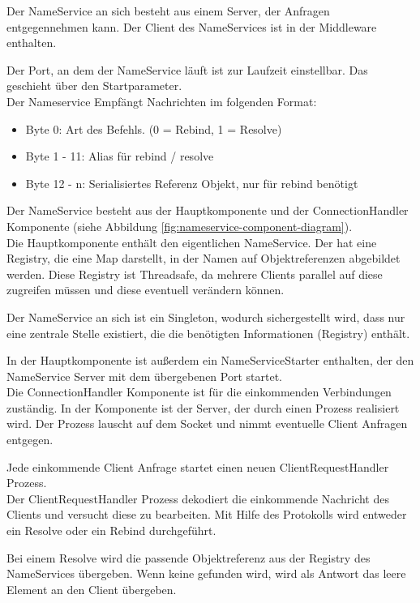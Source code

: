 \documentclass{article}
\begin{document}
Der NameService an sich besteht aus einem Server, der Anfragen entgegennehmen kann.
Der Client des NameServices ist in der Middleware enthalten.

Der Port, an dem der NameService läuft ist zur Laufzeit einstellbar. Das geschieht über den Startparameter.\\

Der Nameservice Empfängt Nachrichten im folgenden Format:
\begin{itemize}
\item Byte 0: Art des Befehls. (0 = Rebind, 1 = Resolve)
\item Byte 1 - 11: Alias für rebind / resolve
\item Byte 12 - n: Serialisiertes Referenz Objekt, nur für rebind benötigt
\end{itemize}

Der NameService besteht aus der Hauptkomponente und der ConnectionHandler Komponente (siehe Abbildung
\ref{fig:nameservice-component-diagram}).\\

Die Hauptkomponente enthält den eigentlichen NameService. Der hat eine Registry, die eine Map darstellt, in der Namen
auf Objektreferenzen abgebildet werden. Diese Registry ist Threadsafe, da mehrere Clients parallel auf diese
zugreifen müssen und diese eventuell verändern können.

Der NameService an sich ist ein Singleton, wodurch sichergestellt wird, dass nur eine zentrale Stelle existiert, die
die benötigten Informationen (Registry) enthält.

In der Hauptkomponente ist außerdem ein NameServiceStarter enthalten, der den NameService Server mit dem übergebenen
Port startet.\\

Die ConnectionHandler Komponente ist für die einkommenden Verbindungen zuständig. In der Komponente ist der Server, der
durch einen Prozess realisiert wird. Der Prozess lauscht auf dem Socket und nimmt eventuelle Client Anfragen entgegen.

Jede einkommende Client Anfrage startet einen neuen ClientRequestHandler Prozess.\\

Der ClientRequestHandler Prozess dekodiert die einkommende Nachricht des Clients und versucht diese zu bearbeiten.
Mit Hilfe des Protokolls wird entweder ein Resolve oder ein Rebind durchgeführt.

Bei einem Resolve wird die passende Objektreferenz aus der Registry des NameServices übergeben. Wenn keine gefunden
wird, wird als Antwort das leere Element an den Client übergeben.
\end{document}
